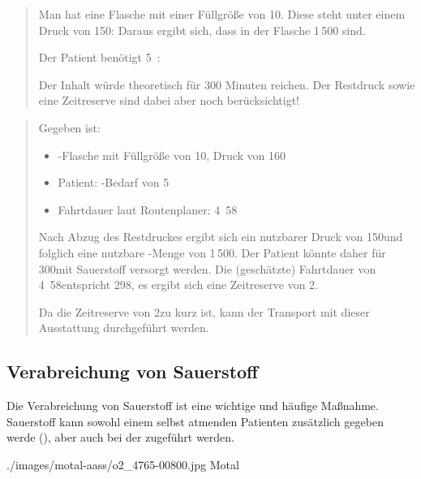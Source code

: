 
\begin{quote}
Man hat eine Flasche mit einer Füllgröße von 10\Liter*. Diese
steht unter einem Druck von 150\Bar*: Daraus ergibt
sich, dass in der Flasche 1\,500\Liter* {} sind.

Der Patient benötigt 5\,\unitfrac{\Liter}{\Min}  : 

Der Inhalt würde theoretisch für 300 Minuten reichen. Der
Restdruck sowie eine Zeitreserve sind dabei
aber noch  berücksichtigt!
\end{quote}


\begin{quote}
Gegeben ist: 
\begin{itemize}
  \item {}-Flasche mit Füllgröße von 10\Liter*, Druck von
160\Bar*
\item Patient: -Bedarf von 5\LPerMin*
\item Fahrtdauer laut Routenplaner:
4\Hour*~58\Min*
\end{itemize}

Nach Abzug des Restdruckes ergibt sich ein nutzbarer Druck
von 150\Bar* und folglich eine nutzbare -Menge von
1\,500\Liter*. Der Patient könnte daher für 300\Min* mit
Sauerstoff versorgt werden. Die (geschätzte) Fahrtdauer
von 4\Hour*~58\Min* entspricht 298\Min*, es ergibt sich
eine Zeitreserve von 2\Min*.

Da die Zeitreserve von 2\Min* zu kurz ist, kann der
Transport mit dieser Ausstattung  durchgeführt
werden. 
\end{quote}

{\TakeNotesBoxLarge}

\subsection{Verabreichung von Sauerstoff}


{%
Die Verabreichung von Sauerstoff ist eine wichtige und häufige
Maßnahme. Sauerstoff kann sowohl einem selbst atmenden Patienten
zusätzlich gegeben werde (), aber auch bei der
 zugeführt werden. 

\bigskip

}
{}
{./images/motal-aass/o2_4765-00800.jpg}
{}
{Motal}



